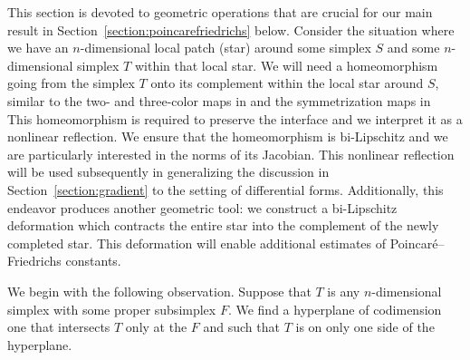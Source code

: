 \documentclass[10pt,letterpaper]{article}
\begin{document}
This section is devoted to geometric operations that are crucial for our main result in Section~\ref{section:poincarefriedrichs} below. 
Consider the situation where we have an $n$-dimensional local patch (star) around some simplex $S$ and some $n$-dimensional simplex $T$ within that local star. 
We will need a homeomorphism going from the simplex $T$ onto its complement within the local star around $S$,
similar to the two- and three-color maps in \cite[Sections~5.3 and~6.3]{ern2020stable} and the symmetrization maps in~\cite[Section~7.6]{Chaum_Voh_p_rob_3D_H_curl_24}
This homeomorphism is required to preserve the interface and we interpret it as a nonlinear reflection. 
We ensure that the homeomorphism is bi-Lipschitz and we are particularly interested in the norms of its Jacobian.
This nonlinear reflection will be used subsequently in generalizing the discussion in Section~\ref{section:gradient} to the setting of differential forms. 
Additionally, this endeavor produces another geometric tool:
we construct a bi-Lipschitz deformation which contracts the entire star into the complement of the newly completed star. 
This deformation will enable additional estimates of Poincar\'e--Friedrichs constants. 

We begin with the following observation. 
Suppose that $T$ is any $n$-dimensional simplex with some proper subsimplex $F$.
We find a hyperplane of codimension one that intersects $T$ only at the $F$ and such that $T$ is on only one side of the hyperplane. 
\end{document}
